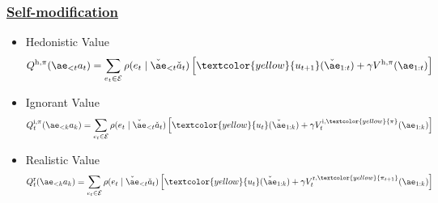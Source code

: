 \documentclass[UTF8,11pt,colorlinks,compress,openany]{beamer}%
\begin{document}
\begin{frame}\frametitle{\href{http://www.tomeveritt.se/}{Self-modification}}
\begin{definition}\hfill
\begin{itemize}
\item Hedonistic Value
\[Q^{\mathrm{h},\pi}(\ae_{<t}a_t)
=\sum\limits_{e_t\in\mathcal{E}}\rho(e_t\mid\check{\ae}_{<t}\check{a}_t)\left[\textcolor{yellow}{u_{t+1}}(\check{\ae}_{1:t}) + \gamma V^{\mathrm{h},\pi}(\ae_{1:t})\right]\]
\item Ignorant Value
\[Q_t^{\mathrm{i},\pi}(\ae_{<k}a_k)
=\sum\limits_{e_t\in\mathcal{E}}\rho(e_t\mid\check{\ae}_{<t}\check{a}_t)\left[\textcolor{yellow}{u_t}(\check{\ae}_{1:k}) + \gamma V_t^{\mathrm{i},\textcolor{yellow}{\pi}}(\ae_{1:k})\right]\]
\item Realistic Value
\[Q_t^{\mathrm{r}}(\ae_{<k}a_k)
=\sum\limits_{e_t\in\mathcal{E}}\rho(e_t\mid\check{\ae}_{<t}\check{a}_t)\left[\textcolor{yellow}{u_t}(\check{\ae}_{1:k}) +
 \gamma V_t^{\mathrm{r},\textcolor{yellow}{\pi_{t+1}}}(\ae_{1:k})\right]\]
\end{itemize}
\end{definition}
\end{frame}
\end{document}
